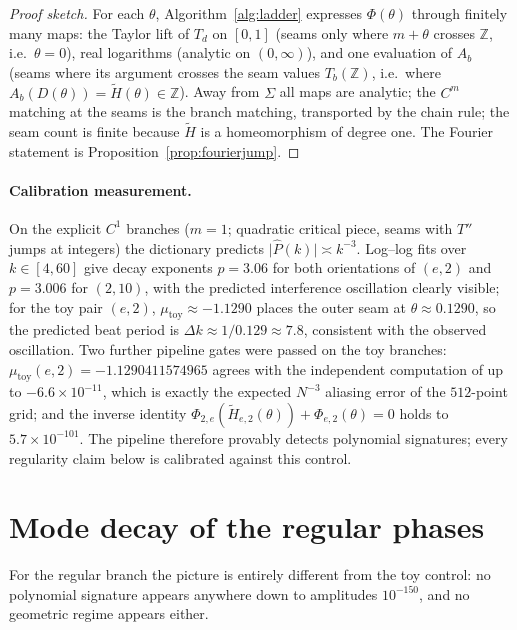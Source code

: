\documentclass[11pt,a4paper]{article}
\theoremstyle{definition}
\theoremstyle{remark}
\newcommand{\Z}{\mathbb{Z}}
\begin{document}
\begin{proof}[Proof sketch]
For each $\theta$, Algorithm~\ref{alg:ladder} expresses $\Phi(\theta)$ through finitely many
maps: the Taylor lift of $T_d$ on $[0,1]$ (seams only where $m+\theta$ crosses $\Z$, i.e.\
$\theta=0$), real logarithms (analytic on $(0,\infty)$), and one evaluation of $A_b$ (seams
where its argument crosses the seam values $T_b(\Z)$, i.e.\ where
$A_b(D(\theta))=\widetilde H(\theta)\in\Z$). Away from $\Sigma$ all maps are analytic; the
$C^m$ matching at the seams is the branch matching, transported by the chain rule; the seam
count is finite because $\widetilde H$ is a homeomorphism of degree one. The Fourier statement
is Proposition~\ref{prop:fourierjump}.
\end{proof}

\paragraph{Calibration measurement.}
On the explicit $C^1$ branches ($m=1$; quadratic critical piece, seams with $T''$ jumps at
integers) the dictionary predicts $\lvert\widehat P(k)\rvert\asymp k^{-3}$. Log--log fits over
$k\in[4,60]$ give decay exponents $p=3.06$ for both orientations of $(e,2)$ and $p=3.006$ for
$(2,10)$, with the predicted interference oscillation clearly visible; for the toy pair
$(e,2)$, $\mu_{\mathrm{toy}}\approx-1.1290$ places the outer seam at
$\theta\approx0.1290$, so the predicted beat period is $\Delta k\approx 1/0.129\approx7.8$,
consistent with the observed oscillation. Two further pipeline gates were passed on the toy
branches: $\mu_{\mathrm{toy}}(e,2)=-1.1290411574965$ agrees with the independent computation
of \cite[Rem.~7.5]{unified} up to $-6.6\times10^{-11}$, which is exactly the expected
$N^{-3}$ aliasing error of the $512$-point grid; and the inverse identity
$\Phi_{2,e}(\widetilde H_{e,2}(\theta))+\Phi_{e,2}(\theta)=0$ holds to $5.7\times10^{-101}$.
The pipeline therefore provably detects polynomial signatures; every regularity claim below
is calibrated against this control.

\section{Mode decay of the regular phases}\label{sec:decay}

For the regular branch the picture is entirely different from the toy control: no polynomial
signature appears anywhere down to amplitudes $10^{-150}$, and no geometric regime appears
either.
\end{document}
